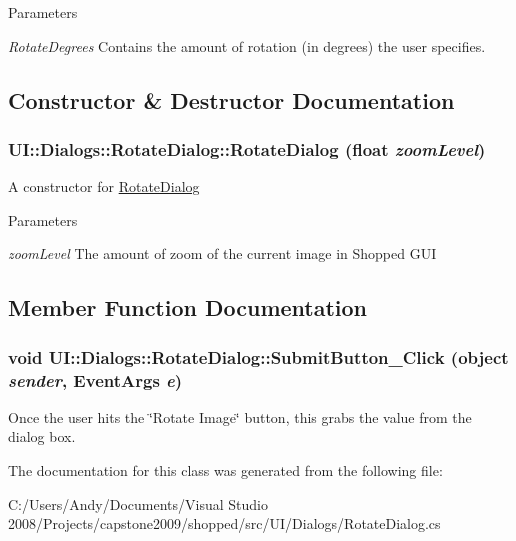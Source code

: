 \begin{DoxyParams}{Parameters}
\item[{\em RotateDegrees}]Contains the amount of rotation (in degrees) the user specifies. \end{DoxyParams}


\subsection{Constructor \& Destructor Documentation}
\hypertarget{class_u_i_1_1_dialogs_1_1_rotate_dialog_ab05642342ce614b274ba50ca34ae5d86}{
\subsubsection[{RotateDialog}]{\setlength{\rightskip}{0pt plus 5cm}UI::Dialogs::RotateDialog::RotateDialog (float {\em zoomLevel})}}
\label{class_u_i_1_1_dialogs_1_1_rotate_dialog_ab05642342ce614b274ba50ca34ae5d86}
A constructor for \hyperlink{class_u_i_1_1_dialogs_1_1_rotate_dialog}{RotateDialog}


\begin{DoxyParams}{Parameters}
\item[{\em zoomLevel}]The amount of zoom of the current image in Shopped GUI \end{DoxyParams}


\subsection{Member Function Documentation}
\hypertarget{class_u_i_1_1_dialogs_1_1_rotate_dialog_ac08acd6e76a45ee3262ee27e126deea1}{
\subsubsection[{SubmitButton\_\-Click}]{\setlength{\rightskip}{0pt plus 5cm}void UI::Dialogs::RotateDialog::SubmitButton\_\-Click (object {\em sender}, \/  EventArgs {\em e})}}
\label{class_u_i_1_1_dialogs_1_1_rotate_dialog_ac08acd6e76a45ee3262ee27e126deea1}
Once the user hits the \char`\"{}Rotate Image\char`\"{} button, this grabs the value from the dialog box. 

The documentation for this class was generated from the following file:\begin{DoxyCompactItemize}
\item 
C:/Users/Andy/Documents/Visual Studio 2008/Projects/capstone2009/shopped/src/UI/Dialogs/RotateDialog.cs\end{DoxyCompactItemize}
